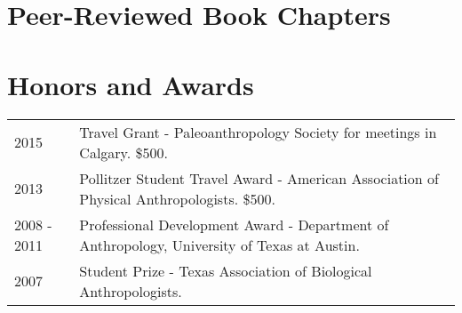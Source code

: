 \documentclass{article}
\begin{document}
\section*{Peer-Reviewed Book Chapters}
\begin{etaremune}

\end{etaremune}

\section*{Honors and Awards}

\begin{tabular}{p{}p{}}
2015 & Travel Grant - Paleoanthropology Society for meetings in Calgary. \$500.\\[4pt]
2013 & Pollitzer Student Travel Award - American Association of Physical Anthropologists. \$500.\\[4pt]
2008 - 2011 & Professional Development Award - Department of Anthropology, University of Texas at Austin.\\[4pt]
2007 & Student Prize - Texas Association of Biological Anthropologists.\\
\end{tabular}
\end{document}
